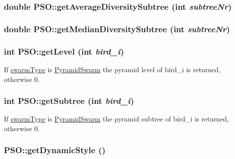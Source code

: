 \hypertarget{classPSO_4f78ee083a3653329aea7faaf086af1b}{
\subsubsection{\setlength{\rightskip}{0pt plus 5cm}double PSO::getAverageDiversitySubtree (int {\em subtreeNr})}}
\label{classPSO_4f78ee083a3653329aea7faaf086af1b}


\hypertarget{classPSO_be9ebcc8c0b943ad7c03212d9f7486c2}{
\subsubsection{\setlength{\rightskip}{0pt plus 5cm}double PSO::getMedianDiversitySubtree (int {\em subtreeNr})}}
\label{classPSO_be9ebcc8c0b943ad7c03212d9f7486c2}


\hypertarget{classPSO_c29458ae9af544902866955fe9c0c009}{
\subsubsection{\setlength{\rightskip}{0pt plus 5cm}int PSO::getLevel (int {\em bird\_\-i})}}
\label{classPSO_c29458ae9af544902866955fe9c0c009}


If \hyperlink{classPSO_ab45164d2c0f86041d014fa51ebb78b5}{swarmType} is \hyperlink{classPyramidSwarm}{PyramidSwarm} the pyramid level of bird\_\-i is returned, otherwise 0. 

\hypertarget{classPSO_a7fa2ebaf0bc46e343ebfa29d539f800}{
\subsubsection{\setlength{\rightskip}{0pt plus 5cm}int PSO::getSubtree (int {\em bird\_\-i})}}
\label{classPSO_a7fa2ebaf0bc46e343ebfa29d539f800}


If \hyperlink{classPSO_ab45164d2c0f86041d014fa51ebb78b5}{swarmType} is \hyperlink{classPyramidSwarm}{PyramidSwarm} the pyramid subtree of bird\_\-i is returned, otherwise 0. 

\hypertarget{classPSO_b39abf541d9a73383613ebc507f07a2c}{
\subsubsection{ PSO::getDynamicStyle ()}}
\label{classPSO_b39abf541d9a73383613ebc507f07a2c}


